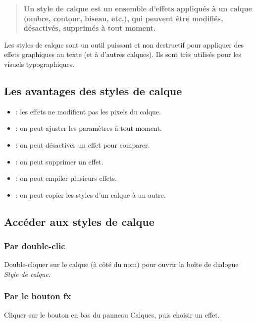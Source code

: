 \begin{quote}
\textbf{Un style de calque est un ensemble d'effets appliqués à un calque (ombre, contour, biseau, etc.), qui peuvent être modifiés, désactivés, supprimés à tout moment.}
\end{quote}

Les styles de calque sont un outil puissant et non destructif pour appliquer des effets graphiques au texte (et à d'autres calques). Ils sont très utilisés pour les visuels typographiques.

\subsection{Les avantages des styles de calque}

\begin{itemize}
    \item {} : les effets ne modifient pas les pixels du calque.
    \item {} : on peut ajuster les paramètres à tout moment.
    \item {} : on peut désactiver un effet pour comparer.
    \item {} : on peut supprimer un effet.
    \item {} : on peut empiler plusieurs effets.
    \item {} : on peut copier les styles d'un calque à un autre.
\end{itemize}

\subsection{Accéder aux styles de calque}

\subsubsection{Par double-clic}

Double-cliquer sur le calque (à côté du nom) pour ouvrir la boîte de dialogue \emph{Style de calque}.

\subsubsection{Par le bouton fx}

Cliquer sur le bouton  en bas du panneau Calques, puis choisir un effet.

